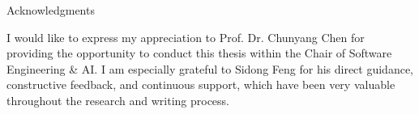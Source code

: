 \thispagestyle{empty}

\vspace*{20mm}

\begin{center}
{ Acknowledgments}
\end{center}

\vspace{10mm}

I would like to express my appreciation to Prof. Dr. Chunyang Chen 
for providing the opportunity to conduct this thesis within the 
Chair of Software Engineering \& AI.
I am especially grateful to Sidong Feng for his direct guidance, 
constructive feedback, and continuous support, which have been 
very valuable throughout the research and writing process.

\cleardoublepage{}
